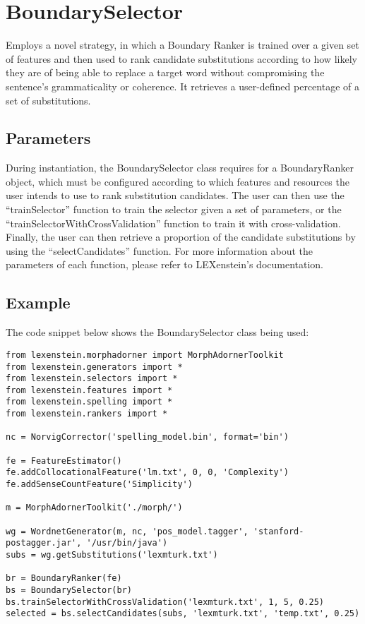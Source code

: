 \section{BoundarySelector}

Employs a novel strategy, in which a Boundary Ranker is trained over a given set of features and then used to rank candidate substitutions according to how likely they are of being able to replace a target word without compromising the sentence's grammaticality or coherence. It retrieves a user-defined percentage of a set of substitutions.

\subsection{Parameters}

During instantiation, the BoundarySelector class requires for a BoundaryRanker object, which must be configured according to which features and resources the user intends to use to rank substitution candidates. The user can then use the ``trainSelector'' function to train the selector given a set of parameters, or the ``trainSelectorWithCrossValidation'' function to train it with cross-validation. Finally, the user can then retrieve a proportion of the candidate substitutions by using the ``selectCandidates'' function. For more information about the parameters of each function, please refer to LEXenstein's documentation.

\subsection{Example}

The code snippet below shows the BoundarySelector class being used:

\begin{lstlisting}
from lexenstein.morphadorner import MorphAdornerToolkit
from lexenstein.generators import *
from lexenstein.selectors import *
from lexenstein.features import *
from lexenstein.spelling import *
from lexenstein.rankers import *

nc = NorvigCorrector('spelling_model.bin', format='bin')

fe = FeatureEstimator()
fe.addCollocationalFeature('lm.txt', 0, 0, 'Complexity')
fe.addSenseCountFeature('Simplicity')

m = MorphAdornerToolkit('./morph/')

wg = WordnetGenerator(m, nc, 'pos_model.tagger', 'stanford-postagger.jar', '/usr/bin/java')
subs = wg.getSubstitutions('lexmturk.txt')

br = BoundaryRanker(fe)
bs = BoundarySelector(br)
bs.trainSelectorWithCrossValidation('lexmturk.txt', 1, 5, 0.25)
selected = bs.selectCandidates(subs, 'lexmturk.txt', 'temp.txt', 0.25)
\end{lstlisting}










